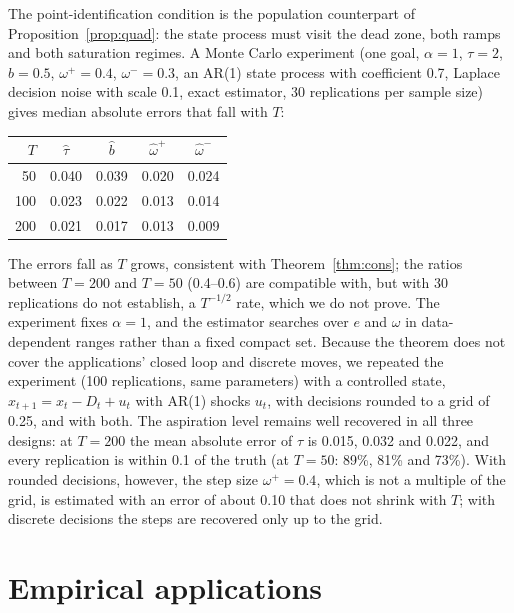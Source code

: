 \documentclass[11pt,a4paper]{article}
\theoremstyle{remark}\newtheorem{remark}{Remark}
\begin{document}
The point-identification condition is the population counterpart of Proposition~\ref{prop:quad}: the state process must visit the dead zone, both ramps and both saturation regimes. A Monte Carlo experiment (one goal, $\alpha=1$, $\tau=2$, $b=0.5$, $\omega^+=0.4$, $\omega^-=0.3$, an AR(1) state process with coefficient 0.7, Laplace decision noise with scale 0.1, exact estimator, 30 replications per sample size) gives median absolute errors that fall with $T$:
\begin{center}\small\begin{tabular}{rcccc}\toprule
$T$ & $\hat\tau$ & $\hat b$ & $\hat\omega^+$ & $\hat\omega^-$\\\midrule
50 & 0.040 & 0.039 & 0.020 & 0.024\\
100 & 0.023 & 0.022 & 0.013 & 0.014\\
200 & 0.021 & 0.017 & 0.013 & 0.009\\
\bottomrule\end{tabular}\end{center}
The errors fall as $T$ grows, consistent with Theorem~\ref{thm:cons}; the ratios between $T=200$ and $T=50$ (0.4--0.6) are compatible with, but with 30 replications do not establish, a $T^{-1/2}$ rate, which we do not prove. The experiment fixes $\alpha=1$, and the estimator searches over $e$ and $\omega$ in data-dependent ranges rather than a fixed compact set. Because the theorem does not cover the applications' closed loop and discrete moves, we repeated the experiment (100 replications, same parameters) with a controlled state, $x_{t+1}=x_t-D_t+u_t$ with AR(1) shocks $u_t$, with decisions rounded to a grid of 0.25, and with both. The aspiration level remains well recovered in all three designs: at $T=200$ the mean absolute error of $\tau$ is 0.015, 0.032 and 0.022, and every replication is within 0.1 of the truth (at $T=50$: 89\%, 81\% and 73\%). With rounded decisions, however, the step size $\omega^+=0.4$, which is not a multiple of the grid, is estimated with an error of about 0.10 that does not shrink with $T$; with discrete decisions the steps are recovered only up to the grid.

\section{Empirical applications}\label{sec:apps}
\end{document}
